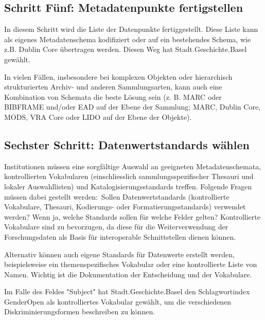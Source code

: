 \documentclass[
  letterpaper,
  DIV=11,
  numbers=noendperiod,
  landscape,
  a4paper,
  geometry:margin=1in]{scrartcl}
\begin{document}
\subsection{Schritt Fünf: Metadatenpunkte
fertigstellen}\label{schritt-fuxfcnf-metadatenpunkte-fertigstellen}

In diesem Schritt wird die Liste der Datenpunkte fertiggestellt. Diese
Liste kann als eigenes Metadatenschema kodifiziert oder auf ein
bestehendes Schema, wie z.B. Dublin Core übertragen werden. Diesen Weg
hat Stadt.Geschichte.Basel gewählt.

In vielen Fällen, insbesondere bei komplexen Objekten oder hierarchisch
strukturierten Archiv- und anderen Sammlungsarten, kann auch eine
Kombination von Schemata die beste Lösung sein (z. B. MARC oder BIBFRAME
und/oder EAD auf der Ebene der Sammlung; MARC, Dublin Core, MODS, VRA
Core oder LIDO auf der Ebene der Objekte).

\subsection{Sechster Schritt: Datenwertstandards
wählen}\label{sechster-schritt-datenwertstandards-wuxe4hlen}

Institutionen müssen eine sorgfältige Auswahl an geeigneten
Metadatenschemata, kontrollierten Vokabularen (einschliesslich
sammlungsspezifischer Thesauri und lokaler Auswahllisten) und
Katalogisierungsstandards treffen. Folgende Fragen müssen dabei gestellt
werden:~Sollen Datenwertstandards (kontrollierte Vokabulare, Thesauri,
Kodierungs- oder Formatierungsstandards) verwendet werden? Wenn ja,
welche Standards sollen für welche Felder gelten? Kontrollierte
Vokabulare sind zu bevorzugen, da diese für die Weiterverwendung der
Forschungsdaten als Basis für interoperable Schnittstellen dienen
können.

Alternativ können auch eigene Standards für Datenwerte erstellt werden,
beispielsweise ein themenspezifisches Vokabular oder eine kontrollierte
Liste von Namen. Wichtig ist die Dokumentation der Entscheidung und der
Vokabulare.

\begin{tcolorbox}[enhanced jigsaw, colframe=quarto-callout-tip-color-frame, bottomtitle=1mm, coltitle=black, opacitybacktitle=0.6, toprule=.15mm, opacityback=0, arc=.35mm, toptitle=1mm, title=\textcolor{quarto-callout-tip-color}{\faLightbulb}\hspace{0.5em}{Erfahrungen der Stadt.Geschichte.Basel}, colbacktitle=quarto-callout-tip-color!10!white, colback=white, bottomrule=.15mm, breakable, titlerule=0mm, rightrule=.15mm, leftrule=.75mm, left=2mm]

Im Falle des Feldes "Subject" hat Stadt.Geschichte.Basel den
Schlagwortindex GenderOpen als kontrolliertes Vokabular gewählt, um die
verschiedenen Diskriminierungsformen beschreiben zu können.

\end{tcolorbox}
\end{document}
